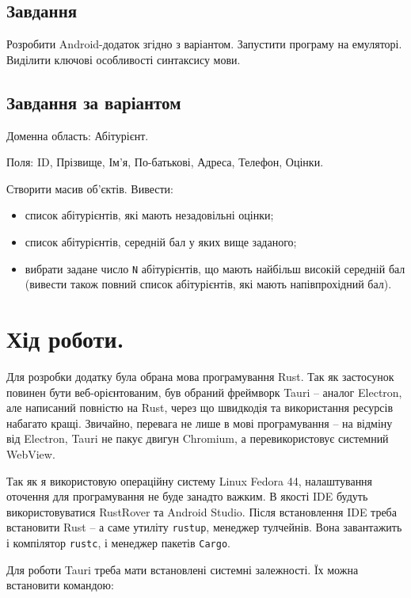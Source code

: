 \documentclass[14pt, a4paper]{extreport}
\begin{document}
	\subsection*{Завдання}
	Розробити Android-додаток згідно з варіантом. Запустити програму на емуляторі. Виділити ключові особливості синтаксису мови.
	
	\subsection*{Завдання за варіантом}
	Доменна область: Абітурієнт. 
	
	Поля:  ID, Прізвище, Ім'я, По-батькові, Адреса, Телефон, Оцінки. 
	
	Створити масив об'єктів. 
	Вивести:
	\begin{itemize}
		\item список абітурієнтів, які мають незадовільні оцінки;
		
		\item список абітурієнтів, середній бал у яких вище заданого;
		
		\item вибрати задане число \texttt{N} абітурієнтів, що мають найбільш високій середній бал (вивести також повний список абітурієнтів, які мають напівпрохідний бал).
	\end{itemize}
	
	\section*{Хід роботи.}
	
	Для розробки додатку була обрана мова програмування Rust. Так як застосунок повинен бути веб-орієнтованим, був обраний фреймворк Tauri -- аналог Electron, але написаний повністю на Rust, через що швидкодія та використання ресурсів набагато кращі. Звичайно, перевага не лише в мові програмування -- на відміну від Electron, Tauri не пакує двигун Chromium, а перевикористовує системний WebView. 
	
	Так як я використовую операційну систему Linux Fedora 44, налаштування оточення для програмування не буде занадто важким. В якості IDE будуть використовуватися RustRover та Android Studio. Після встановлення IDE треба встановити Rust -- а саме утиліту \texttt{rustup}, менеджер тулчейнів. Вона завантажить і компілятор \texttt{rustc}, і менеджер пакетів \texttt{Cargo}.
	
	Для роботи Tauri треба мати встановлені системні залежності. Їх можна встановити командою:
	
\end{document}
